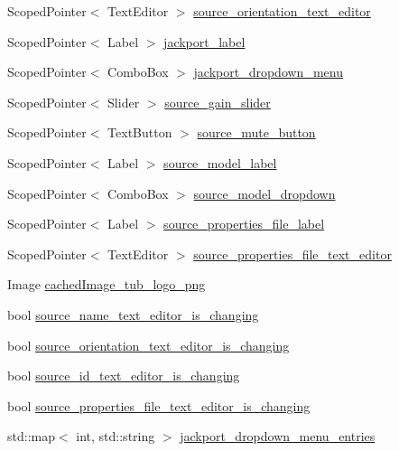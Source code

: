\begin{DoxyCompactItemize}
\item 
Scoped\-Pointer$<$ Text\-Editor $>$ \hyperlink{classSSRSceneAutomationProcessorEditor_a572b560f0fa280dbd86796784ea93f6d}{source\-\_\-orientation\-\_\-text\-\_\-editor}
\item 
Scoped\-Pointer$<$ Label $>$ \hyperlink{classSSRSceneAutomationProcessorEditor_a32193336b4501ff1a705d51efbb1ba3b}{jackport\-\_\-label}
\item 
Scoped\-Pointer$<$ Combo\-Box $>$ \hyperlink{classSSRSceneAutomationProcessorEditor_ae47da15ca901f131c7225e57d8f7e9d3}{jackport\-\_\-dropdown\-\_\-menu}
\item 
Scoped\-Pointer$<$ Slider $>$ \hyperlink{classSSRSceneAutomationProcessorEditor_a8b6b6c062c81ad52a26fac4576cfb5a3}{source\-\_\-gain\-\_\-slider}
\item 
Scoped\-Pointer$<$ Text\-Button $>$ \hyperlink{classSSRSceneAutomationProcessorEditor_a422e70882a85cf2bb1f0318198956dbe}{source\-\_\-mute\-\_\-button}
\item 
Scoped\-Pointer$<$ Label $>$ \hyperlink{classSSRSceneAutomationProcessorEditor_ab5ae83420f2f2920091a28276d53451d}{source\-\_\-model\-\_\-label}
\item 
Scoped\-Pointer$<$ Combo\-Box $>$ \hyperlink{classSSRSceneAutomationProcessorEditor_a4dbdd07cfff3b73d474e04c5ad63c17f}{source\-\_\-model\-\_\-dropdown}
\item 
Scoped\-Pointer$<$ Label $>$ \hyperlink{classSSRSceneAutomationProcessorEditor_adc6f53764eebe7e985d7e7538b657766}{source\-\_\-properties\-\_\-file\-\_\-label}
\item 
Scoped\-Pointer$<$ Text\-Editor $>$ \hyperlink{classSSRSceneAutomationProcessorEditor_accfe386cb8e7ea25adae552e90897e45}{source\-\_\-properties\-\_\-file\-\_\-text\-\_\-editor}
\item 
Image \hyperlink{classSSRSceneAutomationProcessorEditor_a41cd6db52b2b7bfce4c888ab81bc527b}{cached\-Image\-\_\-tub\-\_\-logo\-\_\-png}
\item 
bool \hyperlink{classSSRSceneAutomationProcessorEditor_a9b038b3d9f1465f812e83a1ec6c619ea}{source\-\_\-name\-\_\-text\-\_\-editor\-\_\-is\-\_\-changing}
\item 
bool \hyperlink{classSSRSceneAutomationProcessorEditor_ae007a69167bba11989cab71c4eefabfa}{source\-\_\-orientation\-\_\-text\-\_\-editor\-\_\-is\-\_\-changing}
\item 
bool \hyperlink{classSSRSceneAutomationProcessorEditor_acc73360f4769e235353906726183903d}{source\-\_\-id\-\_\-text\-\_\-editor\-\_\-is\-\_\-changing}
\item 
bool \hyperlink{classSSRSceneAutomationProcessorEditor_ac9ea7632491a932069641de078345b68}{source\-\_\-properties\-\_\-file\-\_\-text\-\_\-editor\-\_\-is\-\_\-changing}
\item 
std\-::map$<$ int, std\-::string $>$ \hyperlink{classSSRSceneAutomationProcessorEditor_aed17d392514ab283992f6a43d12f23d9}{jackport\-\_\-dropdown\-\_\-menu\-\_\-entries}
\end{DoxyCompactItemize}


